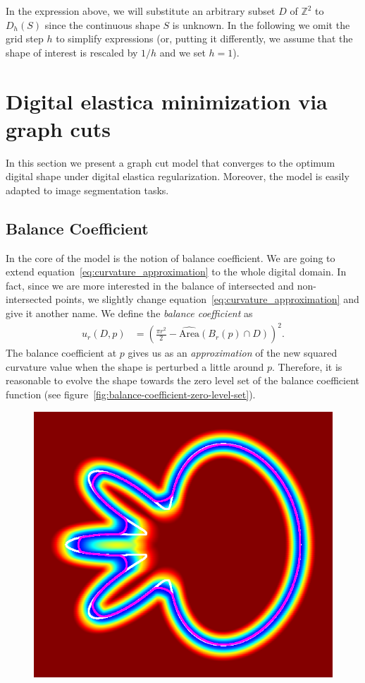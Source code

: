 \documentclass[runningheads]{llncs}
\newcommand{\daniel}[1]{ {\color{blue}#1} }
\newcommand{\Ds}{D}
\begin{document}
In the expression above, we will substitute an arbitrary
subset $\Ds$ of $\mathbb{Z}^2$ to $D_h(S)$ since the continuous shape $S$ is unknown.  In the following we omit
the grid step $h$ to simplify expressions (or, putting it differently, we assume that the shape of interest is
rescaled by $1/h$ and we set $h=1$).


\section{Digital elastica minimization via graph cuts}
In this section we present a graph cut model that converges to the optimum digital shape under digital elastica
regularization. Moreover, the model is easily adapted to image segmentation tasks. 

\daniel{\subsection{Balance Coefficient}
In the core of the model is the notion of balance coefficient. We are going to extend equation~\ref{eq:curvature_approximation} to the whole digital domain. In fact, since we are more interested in the  balance of intersected and non-intersected points, we slightly change equation~\ref{eq:curvature_approximation} and give it another name. We define the \emph{balance coefficient} as
%
\begin{align*}
  u_r(D,p) &= \left( \frac{\pi r^2}{2} - \widehat{\text{Area}}(B_r(p) \cap D) \right)^2.
\end{align*}
%
 The balance coefficient at $p$ gives us as an \emph{approximation} of the new squared curvature value when the shape is perturbed a little around $p$. Therefore, it is reasonable to evolve the shape towards the zero level set of the balance coefficient function (see figure~\ref{fig:balance-coefficient-zero-level-set}).
\begin{figure}
 \center
 \includegraphics[scale=0.32]{figures/zero-level-set/balance-coefficient-zero-level-set.png}

\end{figure}}
\end{document}
